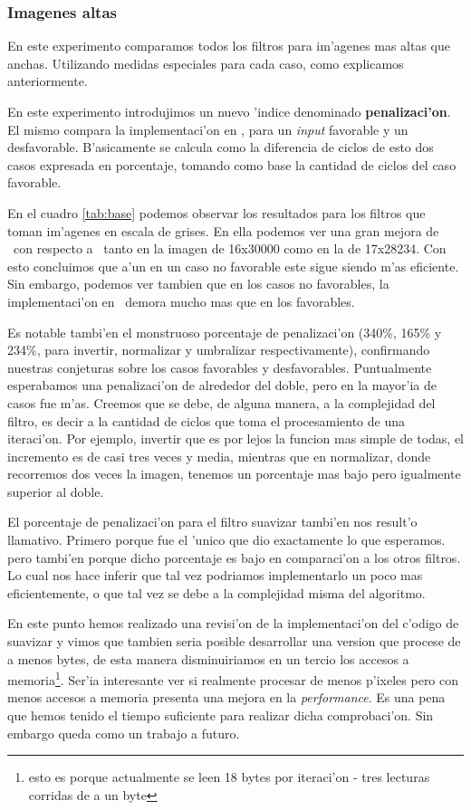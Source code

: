 \subsubsection{Imagenes altas}
En este experimento comparamos todos los filtros para im'agenes mas altas que anchas. Utilizando medidas especiales para cada caso, como explicamos anteriormente. 

En este experimento introdujimos un nuevo 'indice denominado \textbf{penalizaci'on}. El mismo compara la implementaci'on en \ass, para un \textit{input} favorable y un desfavorable. B'asicamente se calcula como la diferencia de ciclos de esto dos casos expresada en porcentaje, tomando como base la cantidad de ciclos del caso favorable.

En el cuadro \ref{tab:base} podemos observar los resultados para los filtros que toman im'agenes en escala de grises. En ella podemos ver una 
gran mejora de \ass \ con respecto a \C \  tanto en la imagen de 16x30000 como en la de 17x28234. Con esto concluimos que a'un
en un caso no favorable este sigue siendo m'as eficiente. Sin embargo, podemos ver tambien que en los casos no favorables, la implementaci'on en \ass \ demora mucho mas que en los favorables. 

Es notable tambi'en el monstruoso porcentaje de penalizaci'on (340\%, 165\% y
234\%, para invertir, normalizar y umbralizar respectivamente), confirmando nuestras conjeturas sobre los casos favorables y desfavorables. Puntualmente esperabamos una penalizaci'on de alrededor del doble, pero en la mayor'ia de casos fue m'as. Creemos que se debe, de alguna manera, a la complejidad del filtro, es decir a la cantidad de ciclos que toma el procesamiento de una iteraci'on. Por ejemplo, invertir que es por lejos la funcion mas simple de todas, el incremento es de casi tres veces y media, mientras que en normalizar, donde recorremos dos veces la imagen, tenemos un porcentaje mas bajo pero igualmente superior al doble. 

El porcentaje de penalizaci'on para el filtro suavizar tambi'en nos result'o llamativo. Primero porque fue el 'unico que dio exactamente lo que esperamos. pero tambi'en porque dicho porcentaje es bajo en comparaci'on a los otros filtros. Lo cual nos hace inferir que tal vez podriamos implementarlo un poco mas eficientemente, o que tal vez se debe a la complejidad misma del algoritmo. 

En este punto hemos realizado una revisi'on de la implementaci'on del c'odigo de suavizar y vimos que tambien seria posible desarrollar una version que procese de a menos bytes, de esta manera disminuiriamos en un tercio los accesos a memoria\footnote{esto es porque actualmente se leen 18 bytes por iteraci'on - tres lecturas corridas de a un byte}. Ser'ia interesante ver si realmente procesar de menos p'ixeles pero con menos accesos a memoria presenta una mejora en la \textit{performance}. Es una pena que hemos tenido el tiempo suficiente para realizar dicha comprobaci'on. Sin embargo queda como un trabajo a futuro.

